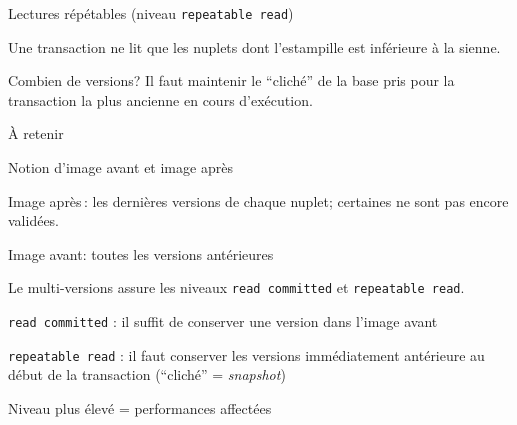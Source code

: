 \begin{frame}{Lectures répétables (niveau \texttt{repeatable read}) }

Une transaction ne lit que
les nuplets dont l'estampille est inférieure à la sienne. 

\vfill




\vfill
\begin{blocgauche}\alert{Combien de versions?} Il faut maintenir le ``cliché'' de la base pris
  pour la transaction la plus ancienne en cours d'exécution.
\end{blocgauche}

\end{frame}


\begin{frame}{À retenir}

Notion \alert{d'image avant} et \alert{image après}
\begin{redbullet}
  \item \alert{Image après}\,: les dernières versions de chaque nuplet; certaines
      ne sont pas encore validées.
       
  \item \alert{Image avant}: toutes les versions antérieures
\end{redbullet}

\vfill

Le multi-versions assure les niveaux \texttt{read committed} et \texttt{repeatable read}.

\begin{redbullet}
  \item \texttt{read committed} : il suffit de conserver une version dans l'image avant
  \item \texttt{repeatable read} : il faut conserver les versions immédiatement antérieure
    au début de la transaction (``cliché'' = \textit{snapshot})
\end{redbullet}

\vfill

Niveau plus élevé = performances affectées
\end{frame}
